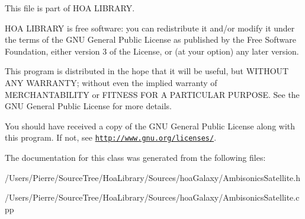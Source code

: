 This file is part of H\-O\-A L\-I\-B\-R\-A\-R\-Y.

H\-O\-A L\-I\-B\-R\-A\-R\-Y is free software\-: you can redistribute it and/or modify it under the terms of the G\-N\-U General Public License as published by the Free Software Foundation, either version 3 of the License, or (at your option) any later version.

This program is distributed in the hope that it will be useful, but W\-I\-T\-H\-O\-U\-T A\-N\-Y W\-A\-R\-R\-A\-N\-T\-Y; without even the implied warranty of M\-E\-R\-C\-H\-A\-N\-T\-A\-B\-I\-L\-I\-T\-Y or F\-I\-T\-N\-E\-S\-S F\-O\-R A P\-A\-R\-T\-I\-C\-U\-L\-A\-R P\-U\-R\-P\-O\-S\-E. See the G\-N\-U General Public License for more details.

You should have received a copy of the G\-N\-U General Public License along with this program. If not, see \href{http://www.gnu.org/licenses/}{\tt http\-://www.\-gnu.\-org/licenses/}. 

The documentation for this class was generated from the following files\-:\begin{DoxyCompactItemize}
\item 
/\-Users/\-Pierre/\-Source\-Tree/\-Hoa\-Library/\-Sources/hoa\-Galaxy/Ambisonics\-Satellite.\-h\item 
/\-Users/\-Pierre/\-Source\-Tree/\-Hoa\-Library/\-Sources/hoa\-Galaxy/Ambisonics\-Satellite.\-cpp\end{DoxyCompactItemize}
